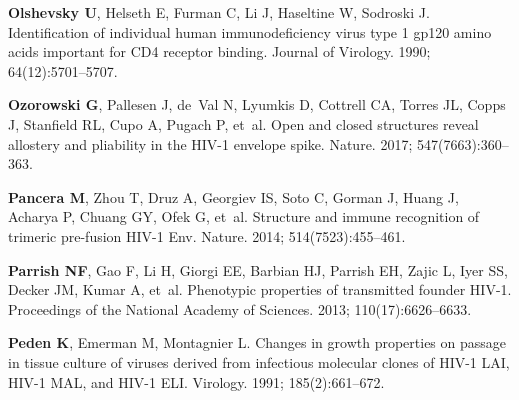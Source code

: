 \documentclass[9pt]{elife}
\begin{document}
\begin{thebibliography}{114}
\textbf{\color{eLifeMediumGrey} Olshevsky U}, Helseth E, Furman C, Li J,
  Haseltine W, Sodroski J.
\newblock Identification of individual human immunodeficiency virus type 1
  gp120 amino acids important for CD4 receptor binding.
\newblock Journal of Virology.  1990; 64(12):5701--5707.

\textbf{\color{eLifeMediumGrey} Ozorowski G}, Pallesen J, de~Val N, Lyumkis D,
  Cottrell CA, Torres JL, Copps J, Stanfield RL, Cupo A, Pugach P, et~al.
\newblock Open and closed structures reveal allostery and pliability in the
  HIV-1 envelope spike.
\newblock Nature.  2017; 547(7663):360--363.

\textbf{\color{eLifeMediumGrey} Pancera M}, Zhou T, Druz A, Georgiev IS, Soto
  C, Gorman J, Huang J, Acharya P, Chuang GY, Ofek G, et~al.
\newblock Structure and immune recognition of trimeric pre-fusion HIV-1 Env.
\newblock Nature.  2014; 514(7523):455--461.

\textbf{\color{eLifeMediumGrey} Parrish NF}, Gao F, Li H, Giorgi EE, Barbian
  HJ, Parrish EH, Zajic L, Iyer SS, Decker JM, Kumar A, et~al.
\newblock Phenotypic properties of transmitted founder {HIV-1}.
\newblock Proceedings of the National Academy of Sciences.  2013;
  110(17):6626--6633.

\textbf{\color{eLifeMediumGrey} Peden K}, Emerman M, Montagnier L.
\newblock Changes in growth properties on passage in tissue culture of viruses
  derived from infectious molecular clones of HIV-1 LAI, HIV-1 MAL, and HIV-1
  ELI.
\newblock Virology.  1991; 185(2):661--672.


\end{thebibliography}
\end{document}
